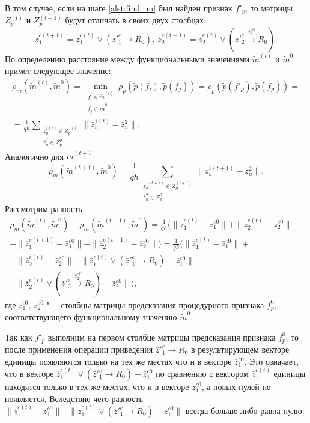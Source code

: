 \documentclass[a4paper, 12pt]{article}
\numberwithin{equation}{section}
\begin{document}
		В том случае, если на шаге \ref{alst:find_m} был найден признак $f'_p$, то матрицы $Z_p^{(t)}$ и $Z_p^{(t+1)}$ будут отличать в своих двух столбцах:
		\begin{equation*}
		\bar z_1^{c(t+1)}=\bar z_1^{c(t)}\vee (\bar z'^c_1\rightarrow R_0),\ \bar z_2^{e(t+1)}=\bar z_2^{e(t)}\vee (\bar z'^e_2\xrightarrow{\bar z_2^{e0}} R_0).
		\end{equation*}
		По определению расстояние между функциональными значениями $\tilde m^{(t)}$ и $\tilde m^0$ примет следующее значение:
		\begin{eqnarray*}
			\rho_m(\tilde m^{(t)},\tilde m^0)=\min\limits_{\substack{f_i\in\tilde m^{(t)}\\f_j\in\tilde m^0}}\rho_p(\tilde p(f_i),\tilde p(f_j ))=\rho_p(\tilde p(f'_p),\tilde p(f_p))=\\
			=\frac{1}{qh}\sum\limits_{\substack{\bar z_u^{1(t)}\in Z_p^{(t)}\\\bar z_u^2\in Z_p^0}}\|\bar z_u^{1(t)}-\bar z_u^2\|.
		\end{eqnarray*}
		Аналогично для $\tilde m^{(t+1)}$
		\begin{equation*}
		\rho_m(\tilde m^{(t+1)},\tilde m^0)=\frac{1}{qh}\sum_{\substack{\bar z_u^{1(t+1)}\in Z_p^{(t+1)}\\\bar z_u^2\in Z_p^0}}\|\bar z_u^{1(t+1)}-\bar z_u^2\|.
		\end{equation*}
		Рассмотрим разность 
		\begin{eqnarray*}
			\rho_m(\tilde m^{(t)},\tilde m^0)-\rho_m(\tilde m^{(t+1)},\tilde m^0)=\frac{1}{qh}(\|\bar z_1^{c(t)}-\bar z_1^{c0}\|+\|\bar z_2^{e(t)}-\bar z_2^{e0}\|-\nonumber \\
			-\|\bar z_1^{c(t+1)}-\bar z_1^{c0}\|-\|\bar z_2^{e(t+1)}-\bar z_2^{e0}\|)=\frac{1}{qh}(\|\bar z_1^{c(t)}-\bar z_1^{c0}\|+\nonumber \\
			+\|\bar z_2^{e(t)}-\bar z_2^{e0}\|-\|\bar z_1^{c(t)}\vee (\bar z'^c_1\rightarrow R_0)-\bar z_1^{c0}\|-\nonumber \\
			-\|\bar z_2^{e(t)}\vee (\bar z'^e_2\xrightarrow{\bar z_2^{e0}} R_0)-\bar z_2^{e0}\|),
		\end{eqnarray*}
		где $\bar z_1^{c0}$, $\bar z_2^{e0}$ "--- столбцы матрицы предсказания процедурного признака $f_p^0$, соответствующего функциональному значению $\tilde m^0$.
		
		Так как $f'_p$ выполним на первом столбце матрицы предсказания признака $f_p^0$, то после применения операции приведения $\bar z'^c_1\rightarrow R_0$ в результирующем векторе единицы появляются только на тех же местах что и в векторе $\bar z_1^{c0}$. Это означает, что в векторе $\bar z_1^{c(t)}\vee (\bar z'^c_1\rightarrow R_0)-\bar z_1^{c0}$ по сравнению с вектором $\bar z_1^{c(t)}$  единицы находятся только в тех же местах, что и в векторе $\bar z_1^{c0}$, а новых нулей не появляется. Вследствие чего разность $\|\bar z_1^{c(t)}-\bar z_1^{c0}\|-\|\bar z_1^{c(t)}\vee (\bar z'^c_1\rightarrow R_0)-\bar z_1^{c0}\|$ всегда больше либо равна нулю.
		
\end{document}
